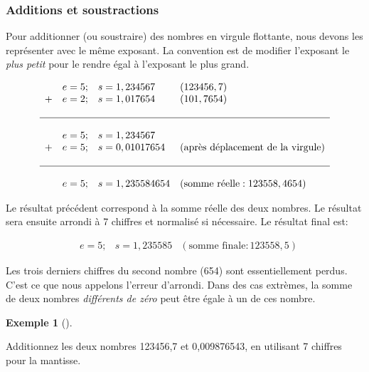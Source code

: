\documentclass[
  letterpaper,
]{scrbook}
\theoremstyle{plain}
\theoremstyle{definition}
\theoremstyle{definition}
\newtheorem{example}{Exemple}[chapter]
\theoremstyle{remark}
\begin{document}
\hypertarget{additions-et-soustractions}{%
\subsubsection{Additions et
soustractions}\label{additions-et-soustractions}}

Pour additionner (ou soustraire) des nombres en virgule flottante, nous
devons les représenter avec le même exposant. La convention est de
modifier l'exposant le \emph{plus petit} pour le rendre égal à
l'exposant le plus grand.

\[
\begin{array}{rrll}
& e=5; & s=1,234567 & (123456,7) \\
+ & e=2; & s=1,017654 & (101,7654) \\ \\
\hline
\\
& e=5; & s=1,234567 &  \\
+ & e=5; & s=0,01017654 & (\text{après déplacement de la virgule}) \\ \\
\hline
\\
& e=5; & s=1,235584654 & (\text{somme réelle}: 123558,4654)
\end{array}
\]

Le résultat précédent correspond à la somme réelle des deux nombres. Le
résultat sera ensuite arrondi à 7 chiffres et normalisé si nécessaire.
Le résultat final est:

\[
\begin{array}{rrll}
& e=5; & s=1,235585 & (\text{somme finale}: 123558,5)
\end{array}
\]

Les trois derniers chiffres du second nombre (654) sont essentiellement
perdus. C'est ce que nous appelons l'erreur d'arrondi. Dans des cas
extrèmes, la somme de deux nombres \emph{différents de zéro} peut être
égale à un de ces nombre.

\begin{example}[]\protect\hypertarget{exm-addition-deux-nombres}{}\label{exm-addition-deux-nombres}

Additionnez les deux nombres 123456,7 et 0,009876543, en utilisant 7
chiffres pour la mantisse.

\end{example}
\end{document}
